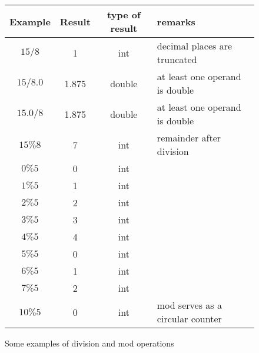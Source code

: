 




\begin {figure}


\begin{tabular} {c c c l}
Example & Result  & type of result & remarks  \\
\hline
$15 / 8$   & 	1 	 & int	& decimal places are truncated \\
$15 / 8.0$ &	1.875    & double & at least one operand is double \\
$15.0 / 8$ &	1.875  	 & double & at least one operand is double \\
$15 \% 8$  & 	7 	 & int 	  & remainder after division \\
$0 \% 5$    & 	0 	 & int 	  &     \\
$1 \% 5$    & 	1 	 & int 	  &     \\
$2 \% 5$    & 	2 	 & int 	  &     \\
$3 \% 5$    & 	3 	 & int 	  &     \\
$4 \% 5$    & 	4 	 & int 	  &     \\
$5 \% 5$    & 	0 	 & int 	  &     \\
$6 \% 5$    & 	1 	 & int 	  &     \\
$7 \% 5$    & 	2 	 & int 	  &     \\
$10 \% 5$   & 	0 	 & int 	  & mod serves as a circular counter \\

\end {tabular}

\caption {Some examples of division and mod operations}
\label {fig:divMod}

\end {figure}


